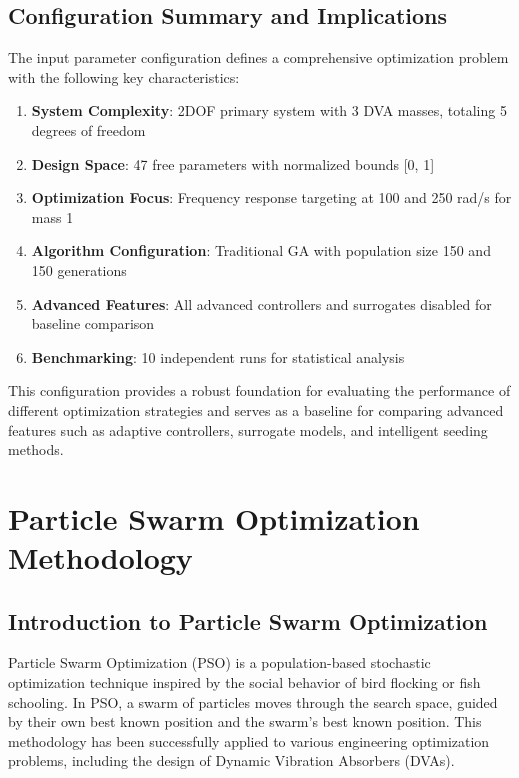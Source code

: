 \documentclass[12pt,a4paper]{article}
\begin{document}
\subsection{Configuration Summary and Implications}

The input parameter configuration defines a comprehensive optimization problem with the following key characteristics:

\begin{enumerate}
    \item \textbf{System Complexity}: 2DOF primary system with 3 DVA masses, totaling 5 degrees of freedom
    \item \textbf{Design Space}: 47 free parameters with normalized bounds [0, 1]
    \item \textbf{Optimization Focus}: Frequency response targeting at 100 and 250 rad/s for mass 1
    \item \textbf{Algorithm Configuration}: Traditional GA with population size 150 and 150 generations
    \item \textbf{Advanced Features}: All advanced controllers and surrogates disabled for baseline comparison
    \item \textbf{Benchmarking}: 10 independent runs for statistical analysis
\end{enumerate}

This configuration provides a robust foundation for evaluating the performance of different optimization strategies and serves as a baseline for comparing advanced features such as adaptive controllers, surrogate models, and intelligent seeding methods.

\section{Particle Swarm Optimization Methodology}
\label{sec:pso_methodology}

\subsection{Introduction to Particle Swarm Optimization}

Particle Swarm Optimization (PSO) is a population-based stochastic optimization technique inspired by the social behavior of bird flocking or fish schooling. In PSO, a swarm of particles moves through the search space, guided by their own best known position and the swarm's best known position. This methodology has been successfully applied to various engineering optimization problems, including the design of Dynamic Vibration Absorbers (DVAs).
\end{document}

